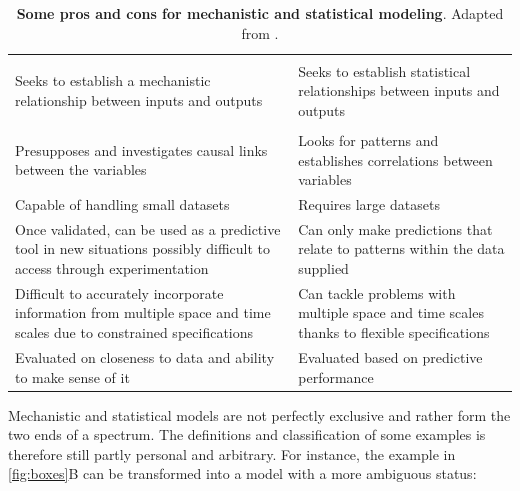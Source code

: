 \documentclass[a4paper,12pt,twoside,onecolumn,openright,final,oldfontcommands]{memoir}
\begin{document}
\begin{table}

\caption{\label{tab:mechstat}\textbf{Some pros and cons for mechanistic and
statistical modeling}. Adapted from \citet{baker2018mechanistic}.}
\centering
\begin{tabular}[t]{>{\raggedright\arraybackslash}p{15em}||>{\raggedright\arraybackslash}p{15em}}
\hline
\rowcolor[HTML]{808080}  \multicolumn{1}{>{\centering\arraybackslash}p{15em}}{\textcolor{white}{\textbf{Mechanistic modeling}}} & \multicolumn{1}{>{\centering\arraybackslash}p{15em}}{\textcolor{white}{\textbf{Statistical modeling}}}\\
\hline
\multicolumn{2}{l}{\textbf{Definition}}\\
\hline
\hspace{1em}Seeks to establish a mechanistic relationship between inputs and outputs & Seeks to establish statistical relationships between inputs and outputs\\
\hline
\multicolumn{2}{l}{\textbf{Pros and cons}}\\
\hline
\hspace{1em}Presupposes and investigates causal links between the variables & Looks for patterns and establishes correlations between variables\\
\hline
\hspace{1em}Capable of handling small datasets & Requires large datasets\\
\hline
\hspace{1em}Once validated, can be used as a predictive tool in new situations possibly difficult to access through experimentation & Can only make predictions that relate to patterns within the data supplied\\
\hline
\hspace{1em}Difficult to accurately incorporate information from multiple space and time scales due to constrained specifications & Can tackle problems with multiple space and time scales thanks to flexible specifications\\
\hline
\hspace{1em}Evaluated on closeness to data and ability to make sense of it & Evaluated based on predictive performance\\
\hline
\end{tabular}
\end{table}




Mechanistic and statistical models are not perfectly exclusive and
rather form the two ends of a spectrum. The definitions and
classification of some examples is therefore still partly personal and
arbitrary. For instance, the example in \ref{fig:boxes}B can be
transformed into a model with a more ambiguous status:
\end{document}

